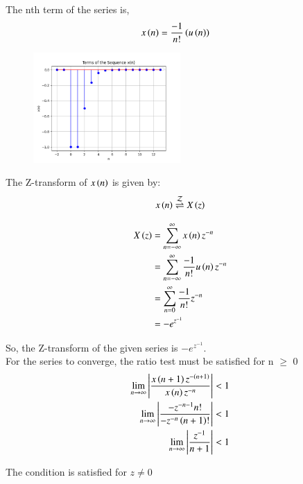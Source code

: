 \documentclass[journal,12pt,twocolumn]{IEEEtran}
\begin{document}
The nth term of the series is,
\begin{align}
    x \left(n\right) & = \frac{-1}{n!}  \left(u \left(n\right)\right)
\end{align}

\begin{figure}
  \centering
  \includegraphics[width=0.5\textwidth]{figs/plot.png}
\end{figure}

The Z-transform of $ x \left(n\right) $ is given by:
\begin{align}
	x \left(n\right) \overset{\mathcal{Z}}{ \rightleftharpoons} X \left(z\right) 
\end{align}

\begin{align}
    X \left(z\right) & = \sum_{n=-\infty}^{\infty} x \left(n\right)   z^{-n} \\
    & = \sum_{n=-\infty}^{\infty} \frac{-1}{n!}  u \left(n\right)   z^{-n} \\
    & = \sum_{n=0}^{\infty} \frac{-1}{n!}   z^{-n} \\
    & = - e^{z^{-1}}
\end{align}

So, the Z-transform of the given series is
$ - e^{z^{-1}} $.\\

For the series to converge, the ratio test must be satisfied for n $\geq$ 0
\begin{align}
 \lim_{{n \to \infty}}  \left| \frac{x \left(n+1\right) z^{- \left(n+1\right)}}{x \left(n\right) z^{-n}}  \right| & <  1 \\
\lim_{{n \to \infty}}  \left| \frac{-z^{-n-1} n!}{-z^{-n}  \left(n+1\right)!} \right| & < 1\\
\lim_{{n \to \infty}}  \left| \frac{z^{-1}}{n+1}  \right| & < 1
\end{align}

The condition is satisfied for $ z \neq 0 $ \\
\end{document}

